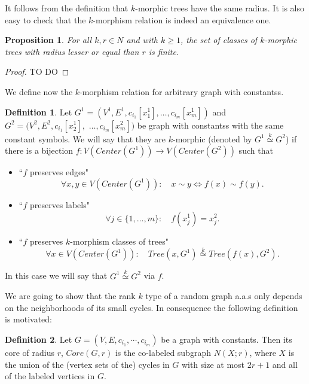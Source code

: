 \documentclass[11pt,notitlepage]{report}
\newtheorem{proposition}{Proposition}[chapter]
\theoremstyle{definition}
\newtheorem{definition}{Definition}[chapter]
\newcommand{\clist}{c_{i_1}, \cdots, c_{i_m}}
\newcommand{\morph}[1]{\stackrel{#1}{\simeq}}
\begin{document}
It follows from the definition that $k$-morphic trees have the same radius. 
It is also easy to check that the $k$-morphism relation is indeed an equivalence one. 

\begin{proposition}
	For all $k,r\in N$ and with $k\geq 1$, the set of classes of $k$-morphic trees
	with radius lesser or equal than $r$ is finite.
\end{proposition}
\begin{proof}
TO DO
\end{proof}

We define now the $k$-morphism relation for arbitrary graph with constantss. 

\begin{definition}
	Let $G^1=(V^1,E^1,c_{i_1}[x^1_1],\dots, c_{i_m}[x_m^1])$ and  $G^2=(V^2,E^2,c_{i_1}[x^1_2],$ 
	$\dots, c_{i_m}[x_m^2])$ be graph with constantss with the same constant symbols. 
	We will say that they are $k$-morphic (denoted by $G^1 \morph{k}G^2$) if there is
	a bijection $f: V(Center(G^1))\rightarrow V(Center(G^2))$ such that
	\begin{itemize}
		\item ``$f$ preserves edges"
		\[\forall x,y\in V(Center(G^1)): \quad  x\sim y \iff f(x)\sim f(y). \]
		\item ``$f$ preserves labels"
		\[\forall j\in \{1,\dots,m\}: \quad f(x^1_j) = x^2_j.\]
		\item ``$f$ preserves $k$-morphism classes of trees"
		\[\forall x\in V(Center(G^1)): \quad  Tree(x,G^1)\morph{k} Tree(f(x),G^2).\]
	\end{itemize}
	In this case we will say that $G^1 \morph{k} G^2$ via $f$. 	
\end{definition}

We are going to show that the rank $k$ type of a random graph a.a.s only 
depends on the neighborhoods of its small cycles. In consequence the following definition
is motivated:

\begin{definition} 
	Let $G=(V,E,\clist)$ be a graph with constants. Then its core of radius $r$, $Core(G,r)$
	is the co-labeled subgraph $N(X;r)$, where $X$ is the union of the (vertex sets of the)
	cycles in $G$ with size at most $2r+1$ and all of the labeled vertices in $G$. 
\end{definition}
\end{document}
